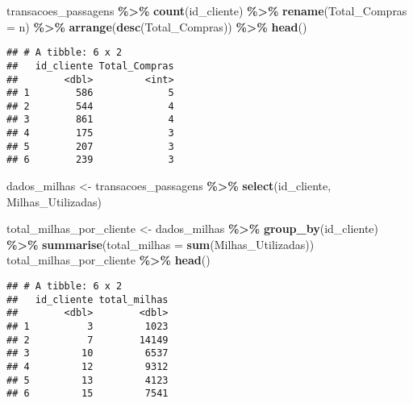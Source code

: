 \documentclass[
]{article}
\newenvironment{Shaded}{\begin{snugshade}}{\end{snugshade}}
\newcommand{\AttributeTok}[1]{\textcolor[rgb]{0.13,0.29,0.53}{#1}}
\newcommand{\FunctionTok}[1]{\textcolor[rgb]{0.13,0.29,0.53}{\textbf{#1}}}
\newcommand{\NormalTok}[1]{#1}
\newcommand{\OtherTok}[1]{\textcolor[rgb]{0.56,0.35,0.01}{#1}}
\newcommand{\SpecialCharTok}[1]{\textcolor[rgb]{0.81,0.36,0.00}{\textbf{#1}}}
\begin{document}
\begin{Shaded}
\begin{Highlighting}[]
\NormalTok{transacoes\_passagens }\SpecialCharTok{\%\textgreater{}\%} \FunctionTok{count}\NormalTok{(id\_cliente) }\SpecialCharTok{\%\textgreater{}\%} \FunctionTok{rename}\NormalTok{(}\AttributeTok{Total\_Compras =}\NormalTok{ n) }\SpecialCharTok{\%\textgreater{}\%} \FunctionTok{arrange}\NormalTok{(}\FunctionTok{desc}\NormalTok{(Total\_Compras)) }\SpecialCharTok{\%\textgreater{}\%} \FunctionTok{head}\NormalTok{()}
\end{Highlighting}
\end{Shaded}

\begin{verbatim}
## # A tibble: 6 x 2
##   id_cliente Total_Compras
##        <dbl>         <int>
## 1        586             5
## 2        544             4
## 3        861             4
## 4        175             3
## 5        207             3
## 6        239             3
\end{verbatim}

\begin{Shaded}
\begin{Highlighting}[]
\NormalTok{dados\_milhas }\OtherTok{\textless{}{-}}\NormalTok{ transacoes\_passagens }\SpecialCharTok{\%\textgreater{}\%} \FunctionTok{select}\NormalTok{(id\_cliente, Milhas\_Utilizadas)}
\end{Highlighting}
\end{Shaded}

\begin{Shaded}
\begin{Highlighting}[]
\NormalTok{total\_milhas\_por\_cliente }\OtherTok{\textless{}{-}}\NormalTok{ dados\_milhas }\SpecialCharTok{\%\textgreater{}\%} \FunctionTok{group\_by}\NormalTok{(id\_cliente) }\SpecialCharTok{\%\textgreater{}\%} \FunctionTok{summarise}\NormalTok{(}\AttributeTok{total\_milhas =} \FunctionTok{sum}\NormalTok{(Milhas\_Utilizadas))}
\NormalTok{total\_milhas\_por\_cliente }\SpecialCharTok{\%\textgreater{}\%} \FunctionTok{head}\NormalTok{()}
\end{Highlighting}
\end{Shaded}

\begin{verbatim}
## # A tibble: 6 x 2
##   id_cliente total_milhas
##        <dbl>        <dbl>
## 1          3         1023
## 2          7        14149
## 3         10         6537
## 4         12         9312
## 5         13         4123
## 6         15         7541
\end{verbatim}
\end{document}
